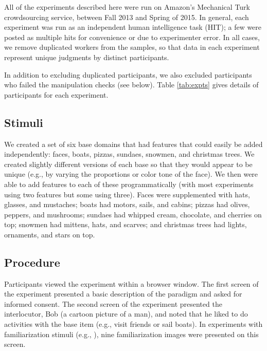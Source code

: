 All of the experiments described here were run on Amazon's Mechanical Turk crowdsourcing service, between Fall 2013 and Spring of 2015. In general, each experiment was run as an independent human intelligence task (HIT); a few were posted as multiple hits for convenience or due to experimenter error. In all cases, we remove duplicated workers from the samples, so that data in each experiment represent unique judgments by distinct participants. 

In addition to excluding duplicated participants, we also excluded participants who failed the manipulation checks (see below). Table \ref{tab:expts} gives details of participants for each experiment. 

\subsection{Stimuli}

We created a set of six base domains that had features that could easily be added independently: faces, boats, pizzas, sundaes, snowmen, and christmas trees. We created slightly different versions of each base so that they would appear to be unique (e.g., by varying the proportions or color tone of the face). We then were able to add features to each of these programmatically (with most experiments using two features but some using three). Faces were supplemented with hats, glasses, and mustaches; boats had motors, sails, and cabins; pizzas had olives, peppers, and mushrooms; sundaes had whipped cream, chocolate, and cherries on top; snowmen had mittens, hats, and scarves; and christmas trees had lights, ornaments, and stars on top.

\subsection{Procedure}

Participants viewed the experiment within a browser window. The first screen of the experiment presented a basic description of the paradigm and asked for informed consent. The second screen of the experiment presented the interlocutor, Bob (a cartoon picture of a man), and noted that he liked to do activities with the base item (e.g., visit friends or sail boats). In experiments with familiarization stimuli (e.g., ), nine familiarization images were presented on this screen. 

